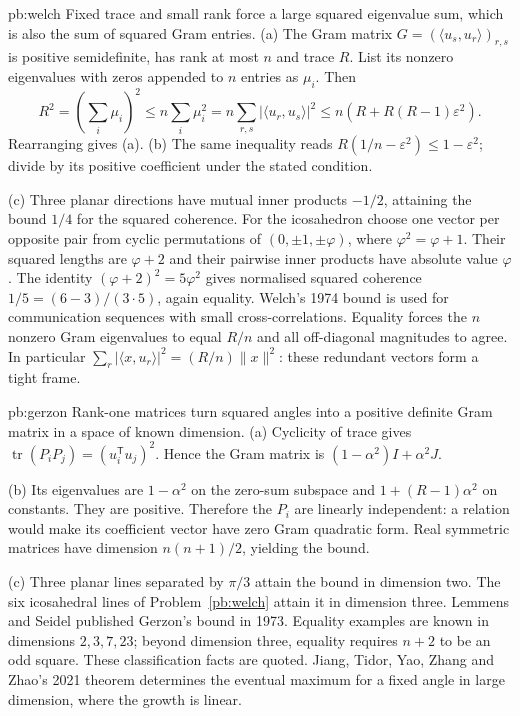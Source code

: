\begin{solution}{pb:welch}
\idea Fixed trace and small rank force a large squared eigenvalue sum, which is also the sum of squared Gram entries.
\writeup (a) The Gram matrix $G=(\langle u_s,u_r\rangle)_{r,s}$ is positive semidefinite, has rank at most $n$ and trace $R$. List its nonzero eigenvalues with zeros appended to $n$ entries as $\mu_i$. Then
\[R^2=(\sum_i\mu_i)^2\le n\sum_i\mu_i^2
 =n\sum_{r,s}|\langle u_r,u_s\rangle|^2
 \le n(R+R(R-1)\varepsilon^2).
\]
Rearranging gives (a). (b) The same inequality reads $R(1/n-\varepsilon^2)\le1-\varepsilon^2$; divide by its positive coefficient under the stated condition.

(c) Three planar directions have mutual inner products $-1/2$, attaining the bound $1/4$ for the squared coherence. For the icosahedron choose one vector per opposite pair from cyclic permutations of $(0,\pm1,\pm\varphi)$, where $\varphi^2=\varphi+1$. Their squared lengths are $\varphi+2$ and their pairwise inner products have absolute value $\varphi$. The identity $(\varphi+2)^2=5\varphi^2$ gives normalised squared coherence $1/5=(6-3)/(3\cdot5)$, again equality.
\leads Welch's 1974 bound is used for communication sequences with small cross-correlations. Equality forces the $n$ nonzero Gram eigenvalues to equal $R/n$ and all off-diagonal magnitudes to agree. In particular $\sum_r|\langle x,u_r\rangle|^2=(R/n)\|x\|^2$: these redundant vectors form a tight frame.
\end{solution}

\begin{solution}{pb:gerzon}
\idea Rank-one matrices turn squared angles into a positive definite Gram matrix in a space of known dimension.
\writeup (a) Cyclicity of trace gives $\operatorname{tr}(P_iP_j)=(u_i^{\mathsf T}u_j)^2$. Hence the Gram matrix is $(1-\alpha^2)I+\alpha^2J$.

(b) Its eigenvalues are $1-\alpha^2$ on the zero-sum subspace and $1+(R-1)\alpha^2$ on constants. They are positive. Therefore the $P_i$ are linearly independent: a relation would make its coefficient vector have zero Gram quadratic form. Real symmetric matrices have dimension $n(n+1)/2$, yielding the bound.

(c) Three planar lines separated by $\pi/3$ attain the bound in dimension two. The six icosahedral lines of Problem~\ref{pb:welch} attain it in dimension three.
\leads Lemmens and Seidel published Gerzon's bound in 1973. Equality examples are known in dimensions $2,3,7,23$; beyond dimension three, equality requires $n+2$ to be an odd square. These classification facts are quoted. Jiang, Tidor, Yao, Zhang and Zhao's 2021 theorem determines the eventual maximum for a fixed angle in large dimension, where the growth is linear.
\end{solution}

